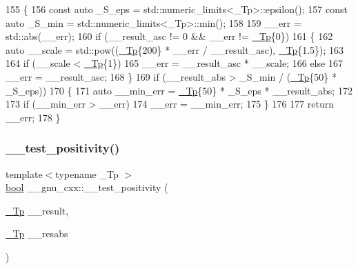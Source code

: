\begin{DoxyCode}
155     \{
156       \textcolor{keyword}{const} \textcolor{keyword}{auto} \_S\_eps = std::numeric\_limits<\_Tp>::epsilon();
157       \textcolor{keyword}{const} \textcolor{keyword}{auto} \_S\_min = std::numeric\_limits<\_Tp>::min();
158 
159       \_\_err = std::abs(\_\_err);
160       \textcolor{keywordflow}{if} (\_\_result\_asc != 0 && \_\_err != \hyperlink{namespace____gnu__cxx_a3b19a9c800ca194374ef9172290f7d79}{\_Tp}\{0\})
161         \{
162           \textcolor{keyword}{auto} \_\_scale = std::pow((\hyperlink{namespace____gnu__cxx_a3b19a9c800ca194374ef9172290f7d79}{\_Tp}\{200\} * \_\_err / \_\_result\_asc), \hyperlink{namespace____gnu__cxx_a3b19a9c800ca194374ef9172290f7d79}{\_Tp}\{1.5\});
163 
164           \textcolor{keywordflow}{if} (\_\_scale < \hyperlink{namespace____gnu__cxx_a3b19a9c800ca194374ef9172290f7d79}{\_Tp}\{1\})
165             \_\_err = \_\_result\_asc * \_\_scale;
166           \textcolor{keywordflow}{else}
167             \_\_err = \_\_result\_asc;
168         \}
169       \textcolor{keywordflow}{if} (\_\_result\_abs > \_S\_min / (\hyperlink{namespace____gnu__cxx_a3b19a9c800ca194374ef9172290f7d79}{\_Tp}\{50\} * \_S\_eps))
170         \{
171           \textcolor{keyword}{auto} \_\_min\_err = \hyperlink{namespace____gnu__cxx_a3b19a9c800ca194374ef9172290f7d79}{\_Tp}\{50\} * \_S\_eps * \_\_result\_abs;
172 
173           \textcolor{keywordflow}{if} (\_\_min\_err > \_\_err)
174             \_\_err = \_\_min\_err;
175         \}
176 
177       \textcolor{keywordflow}{return} \_\_err;
178     \}
\end{DoxyCode}
\mbox{\label{namespace____gnu__cxx_a5e2bf5bffa1d3764b8dc10d04d5c66db}} 
\subsubsection{\texorpdfstring{\+\_\+\+\_\+test\+\_\+positivity()}{\_\_test\_positivity()}}
{\footnotesize\ttfamily template$<$typename \+\_\+\+Tp $>$ \\
\hyperlink{namespace____gnu__cxx_ae83aca57f97767d5d09188718728a0ac}{bool} \+\_\+\+\_\+gnu\+\_\+cxx\+::\+\_\+\+\_\+test\+\_\+positivity (\begin{DoxyParamCaption}\item[{\hyperlink{namespace____gnu__cxx_a3b19a9c800ca194374ef9172290f7d79}{\+\_\+\+Tp}}]{\+\_\+\+\_\+result,  }\item[{\hyperlink{namespace____gnu__cxx_a3b19a9c800ca194374ef9172290f7d79}{\+\_\+\+Tp}}]{\+\_\+\+\_\+resabs }\end{DoxyParamCaption})\hspace{0.3cm}{\ttfamily [inline]}}



